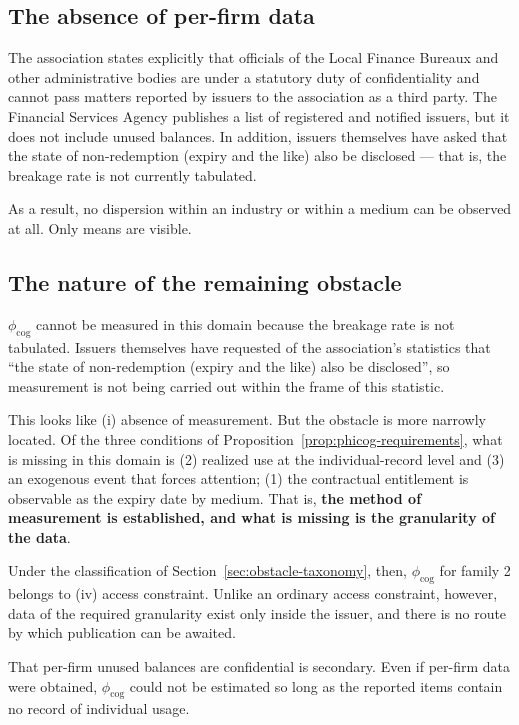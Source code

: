 \subsection{The absence of per-firm data}

The association states explicitly that officials of the Local Finance Bureaux and other
administrative bodies are under a statutory duty of confidentiality and cannot pass matters
reported by issuers to the association as a third party. The Financial Services Agency publishes
a list of registered and notified issuers, but it does not include unused balances. In addition,
issuers themselves have asked that the state of non-redemption (expiry and the like) also be
disclosed — that is, the breakage rate is not currently tabulated.

As a result, no dispersion within an industry or within a medium can be observed at all. Only
means are visible.

\subsection{The nature of the remaining obstacle}

$\phi_{\mathrm{cog}}$ cannot be measured in this domain because the breakage rate is not
tabulated. Issuers themselves have requested of the association's statistics that ``the state of
non-redemption (expiry and the like) also be disclosed'', so measurement is not being carried out
within the frame of this statistic.

This looks like (i) absence of measurement. But the obstacle is more narrowly located. Of the
three conditions of Proposition~\ref{prop:phicog-requirements}, what is missing in this domain is
(2) realized use at the individual-record level and (3) an exogenous event that forces attention;
(1) the contractual entitlement is observable as the expiry date by medium. That is, \textbf{the
method of measurement is established, and what is missing is the granularity of the data}.

Under the classification of Section~\ref{sec:obstacle-taxonomy}, then, $\phi_{\mathrm{cog}}$ for
family 2 belongs to (iv) access constraint. Unlike an ordinary access constraint, however, data
of the required granularity exist only inside the issuer, and there is no route by which
publication can be awaited.

That per-firm unused balances are confidential is secondary. Even if per-firm data were obtained,
$\phi_{\mathrm{cog}}$ could not be estimated so long as the reported items contain no record of
individual usage.

